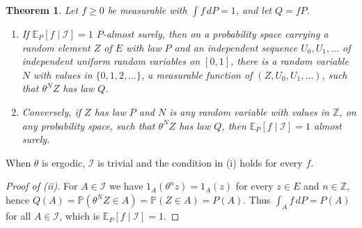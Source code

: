 \documentclass[11pt]{amsart}
\newtheorem{theorem}{Theorem}[section]
\theoremstyle{remark}
\numberwithin{equation}{section}
\newcommand{\E}{\mathbb E}
\newcommand{\Pp}{\mathbb P}
\newcommand{\Z}{\mathbb Z}
\newcommand{\I}{\mathcal I}
\begin{document}
\begin{theorem}\label{thm:filling}
Let $f\ge0$ be measurable with $\int f\,dP=1$, and let $Q=fP$.
\begin{enumerate}[label=\textup{(\roman*)}]
\item If $\E_P[f\mid\I]=1$ $P$-almost surely, then on a probability space carrying a random element $Z$ of $E$ with law $P$ and an independent sequence $U_0,U_1,\dots$ of independent uniform random variables on $[0,1]$, there is a random variable $N$ with values in $\{0,1,2,\dots\}$, a measurable function of $(Z,U_0,U_1,\dots)$, such that $\theta^NZ$ has law $Q$.
\item Conversely, if $Z$ has law $P$ and $N$ is any random variable with values in $\Z$, on any probability space, such that $\theta^NZ$ has law $Q$, then $\E_P[f\mid\I]=1$ almost surely.
\end{enumerate}
\end{theorem}

When $\theta$ is ergodic, $\I$ is trivial and the condition in (i) holds for every $f$.

\begin{proof}[Proof of \textup{(ii)}]
For $A\in\I$ we have $1_A(\theta^nz)=1_A(z)$ for every $z\in E$ and $n\in\Z$, hence $Q(A)=\Pp(\theta^NZ\in A)=\Pp(Z\in A)=P(A)$. Thus $\int_A f\,dP=P(A)$ for all $A\in\I$, which is $\E_P[f\mid\I]=1$.
\end{proof}
\end{document}
